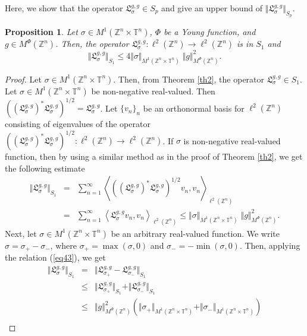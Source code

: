 \documentclass[a4paper,11pt, reqno]{amsart}
\theoremstyle{plain}
\newtheorem{proposition}[theorem]{Proposition}
\theoremstyle{definition}
\theoremstyle{remark}
\def \Z{{\mathbb Z}}
\def \T{{\mathbb T}}
\begin{document}
Here, we show that the operator $\mathfrak{L}^{g, g}_{\sigma} \in S_p$ and give an upper bound of $\Vert \mathfrak{L}^{g, g}_{\sigma} \Vert_{S_p}$. 
\begin{proposition}\label{pro3}
Let $\sigma \in  M^1(\Z^n \times \T^n)$, $\Phi$ be a Young function, and $g \in  M^{\Phi}(\Z^n)$. Then, the operator $\mathfrak{L}^{g, g}_{\sigma}: \ell^2(\Z^n) \to \ell^2(\Z^n) $ is in $S_1$ and 
\[ \Vert \mathfrak{L}^{g, g}_{\sigma} \Vert_{S_1} \leq 4 \Vert \sigma \Vert_{M^1(\Z^n \times \T^n)} \;  \Vert g \Vert^2_{M^{\Phi}(\Z^n)}. \]
\end{proposition}
\begin{proof}
Let $\sigma \in  M^1(\Z^n \times \T^n)$. Then, from Theorem \ref{th2}, the operator $\mathfrak{L}^{g, g}_{\sigma} \in S_1$. Let $\sigma \in M^1(\Z^n \times \T^n)$ be non-negative real-valued. Then $(({\mathfrak{L}^{g, g}_{\sigma}})^* \mathfrak{L}^{g, g}_{\sigma})^{1/2}=\mathfrak{L}^{g, g}_{\sigma}$. Let $\{v_n\}_n$ be an orthonormal basis for $\ell^2(\Z^n)$ consisting of eigenvalues of the operator $(({\mathfrak{L}^{g, g}_{\sigma}})^* \mathfrak{L}^{g, g}_{\sigma})^{1/2}: \ell^2(\Z^n) \to \ell^2(\Z^n)$. If $\sigma$ is non-negative real-valued function, then by using a similar method as in the proof of Theorem \ref{th2}, we get the following estimate
\begin{eqnarray}\label{eq43}
\Vert \mathfrak{L}^{g, g}_{\sigma} \Vert_{S_1}
& =& \sum_{n=1}^\infty \left\langle (({\mathfrak{L}^{g, g}_{\sigma}})^* \mathfrak{L}^{g, g}_{\sigma})^{1/2}v_n, v_n \right\rangle_{\ell^2(\Z^n)} \nonumber \\
&=& \sum_{n=1}^\infty \left\langle \mathfrak{L}^{g, g}_{\sigma} v_n, v_n \right\rangle_{\ell^2(\Z^n)}  
\leq  \Vert \sigma \Vert_{M^1(\Z^n \times \T^n)} \; \Vert g \Vert^2_{M^{\Phi}(\Z^n)} .
\end{eqnarray}
Next, let $\sigma \in M^1(\Z^n \times \T^n)$ be an arbitrary real-valued function. We write $\sigma = \sigma_+ - \sigma_-$, where $\sigma_+=\max(\sigma, 0)$ and $\sigma_-=-\min(\sigma, 0)$. Then, applying the relation (\ref{eq43}), we get
\begin{eqnarray}\label{eq44}
\Vert \mathfrak{L}^{g, g}_{\sigma} \Vert_{S_1}
& = & \Vert \mathfrak{L}^{g, g}_{\sigma_+} -\mathfrak{L}^{g, g}_{\sigma_-} \Vert_{S_1} \nonumber \\
& \leq & \Vert \mathfrak{L}^{g, g}_{\sigma_+} \Vert_{S_1} +\Vert \mathfrak{L}^{g, g}_{\sigma_-} \Vert_{S_1} \nonumber \\
& \leq &  \Vert g \Vert^2_{M^{\Phi}(\Z^n)} (\Vert \sigma_+ \Vert_{M^1(\Z^n \times \T^n)} + \Vert \sigma_- \Vert_{M^1(\Z^n \times \T^n)}) \nonumber \\

\end{eqnarray}
\end{proof}
\end{document}
